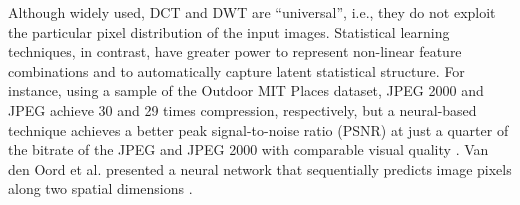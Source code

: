 \documentclass[smallabstract,smallcaptions]{dccpaper}
\begin{document}
Although widely used, DCT and DWT are ``universal'', i.e., they do not exploit the particular pixel distribution of the input images. Statistical learning techniques, in contrast, have greater power to represent non-linear feature combinations and to automatically capture latent statistical structure. %
For instance, using a sample of the Outdoor MIT Places dataset, JPEG 2000 and JPEG achieve 30 and 29 times compression, respectively, but a neural-based technique achieves a better peak signal-to-noise ratio (PSNR) at just a quarter of the bitrate of the JPEG and JPEG 2000 with comparable visual quality \cite{toderici2016full}. Van den Oord et al. presented a neural network that sequentially predicts image pixels along two spatial dimensions \cite{oord2016pixel}.
\end{document}
